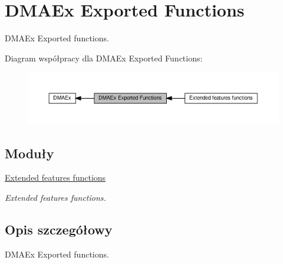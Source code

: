\hypertarget{group___d_m_a_ex___exported___functions}{}\section{D\+M\+A\+Ex Exported Functions}
\label{group___d_m_a_ex___exported___functions}


D\+M\+A\+Ex Exported functions.  


Diagram współpracy dla D\+M\+A\+Ex Exported Functions\+:\nopagebreak
\begin{figure}[H]
\begin{center}
\leavevmode
\includegraphics[width=350pt]{group___d_m_a_ex___exported___functions}
\end{center}
\end{figure}
\subsection*{Moduły}
\begin{DoxyCompactItemize}
\item 
\hyperlink{group___d_m_a_ex___exported___functions___group1}{Extended features functions}
\begin{DoxyCompactList}\small\item\em Extended features functions. \end{DoxyCompactList}\end{DoxyCompactItemize}


\subsection{Opis szczegółowy}
D\+M\+A\+Ex Exported functions. 

